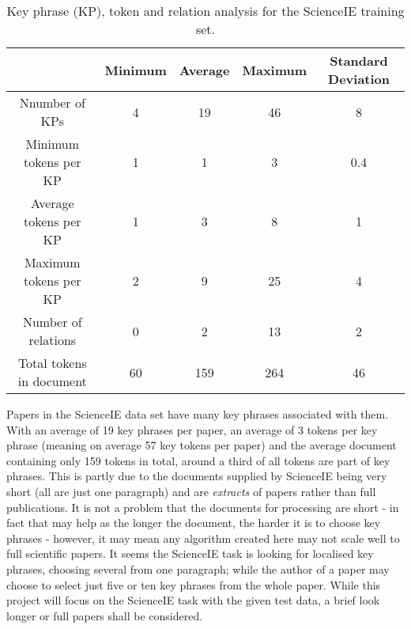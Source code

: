 \begin{table}
	\centering
	\begin{tabular}{ c | c c c c }
		& \textbf{Minimum} & \textbf{Average} & \textbf{Maximum} & \textbf{Standard Deviation} \\
		\hline
		Nnumber of KPs & 4 & 19 & 46 & 8 \\
		Minimum tokens per KP & 1 & 1 & 3 & 0.4 \\
		Average tokens per KP & 1 & 3 & 8 & 1 \\
		Maximum tokens per KP & 2 & 9 & 25 & 4 \\
		Number of relations & 0 & 2 & 13 & 2 \\
		Total tokens in document & 60 & 159 & 264 & 46
	\end{tabular}
	\caption[ScienceIE Training Set Analysis]{Key phrase (KP), token and relation analysis for the ScienceIE training set.}
	\label{table:traininganalysis}
\end{table}

Papers in the ScienceIE data set have many key phrases associated with them. With an average of 19 key phrases per paper, an average of 3 tokens per key phrase (meaning on average 57 key tokens per paper) and the average document containing only 159 tokens in total, around a third of all tokens are part of key phrases. This is partly due to the documents supplied by ScienceIE being very short (all are just one paragraph) and are \textit{extracts} of papers rather than full publications. It is not a problem that the documents for processing are short - in fact that may help as the longer the document, the harder it is to choose key phrases \cite{Hasan2014} - however, it may mean any algorithm created here may not scale well to full scientific papers. It seems the ScienceIE task is looking for localised key phrases, choosing several from one paragraph; while the author of a paper may choose to select just five or ten key phrases from the whole paper. While this project will focus on the ScienceIE task with the given test data, a brief look longer or full papers shall be considered.
